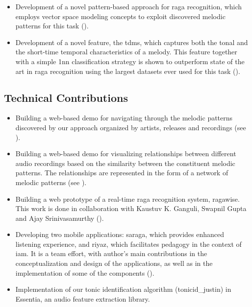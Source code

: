\begin{itemize}
	\item Development of a novel pattern-based approach for \gls{raga} recognition, which employs vector space modeling concepts to exploit discovered melodic patterns for this task (). 
	
	\item Development of a novel feature, the \acrfull{tdms}, which captures both the tonal and the short-time temporal characteristics of a melody. This feature together with a simple \gls{1nn} classification strategy is shown to outperform state of the art in \gls{raga} recognition using the largest datasets ever used for this task (). 
	
\end{itemize}

\subsection*{Technical Contributions}

\begin{itemize}
	\item Building a web-based demo for navigating through the melodic patterns discovered by our approach organized by artists, releases and recordings (see ). 
	\item Building a web-based demo for visualizing relationships between different audio recordings based on the similarity between the constituent melodic patterns. The relationships are represented in the form of a network of melodic patterns (see ).
	\item Building a web prototype of a real-time \gls{raga} recognition system, \gls{ragawise}. This work is done in collaboration with Kaustuv K. Ganguli, Swapnil Gupta and Ajay Srinivasamurthy ().
	\item Developing two mobile applications: \gls{saraga}, which provides enhanced listening experience, and \gls{riyaz}, which facilitates pedagogy in the context of \gls{iam}. It is a team effort, with author's main contributions in the conceptualization and design of the applications, as well as in the implementation of some of the components ().
	\item Implementation of our tonic identification algorithm (\acrshort{tonicid_justin}) in Essentia, an audio feature extraction library.		
\end{itemize}


